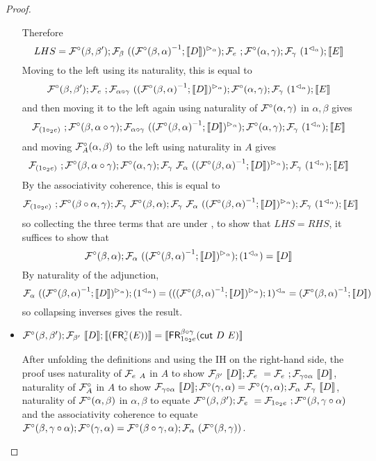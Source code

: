 \documentclass{drl-common/llncs}
\renewcommand{\sem}[1]{\ensuremath{ \llbracket #1 \rrbracket}}
\newcommand{\inv}[1]{\ensuremath{{#1}^{-1}}}
\newcommand\compo[2]{\ensuremath{#1 \circ #2}}
\newcommand\comph[2]{\ensuremath{#1 \mathbin{\circ_2} #2}}
\newcommand\cutsym{\ensuremath{\dsd{cut}}}
\newcommand\cut[2]{\ensuremath{{\cutsym \,\, #1 \,\, #2}}}
\newcommand\FR[3]{\ensuremath{\dsd{FR}^{#1}_{#2}(#3)}}
\begin{document}
\begin{proof}
\begin{itemize}
Therefore 
\[
LHS = \semFcomp(\beta,\beta');\semF{\beta}{(\semltor{(\inv{\semFcomp(\beta,\alpha)};\sem{D})}{\alpha}  )};
\semF{e};\semFcomp(\alpha,\gamma);\semF{\gamma}{(\semrtol{1}{\alpha})};\sem{E}
\]
Moving  to the left using its naturality, this is equal to
\[
\semFcomp(\beta,\beta');\semF{e};\semF{\compo{\alpha}{\gamma}}{(\semltor{(\inv{\semFcomp(\beta,\alpha)};\sem{D})}{\alpha}  )} ;\semFcomp(\alpha,\gamma);\semF{\gamma}{(\semrtol{1}{\alpha})};\sem{E}
\]
and then moving it to the left again using naturality of
$\mathcal{F}^\circ(\alpha,\gamma)$ in $\alpha,\beta$ gives
\[
\semF{(\comph{1}{e})};\semFcomp(\beta,\compo{\alpha}{\gamma});\semF{\compo{\alpha}{\gamma}}{(\semltor{(\inv{\semFcomp(\beta,\alpha)};\sem{D})}{\alpha}  )};\semFcomp(\alpha,\gamma);\semF{\gamma}{(\semrtol{1}{\alpha})};\sem{E}
\]
and moving $\mathcal{F}^\circ_A(\alpha,\beta)$ to the left using naturality in $A$ gives
\[
\semF{(\comph{1}{e})};\semFcomp(\beta,\compo{\alpha}{\gamma});\semFcomp(\alpha,\gamma);\semF{\gamma}{\semF{\alpha}{(\semltor{(\inv{\semFcomp(\beta,\alpha)};\sem{D})}{\alpha}  )}};\semF{\gamma}{(\semrtol{1}{\alpha})};\sem{E}
\]
By the associativity coherence, this is equal to
\[
\semF{(\comph{1}{e})};\semFcomp(\compo{\beta}{\alpha},{\gamma});\semF{\gamma}{\semFcomp(\beta,\alpha)};\semF{\gamma}{\semF{\alpha}{(\semltor{(\inv{\semFcomp(\beta,\alpha)};\sem{D})}{\alpha}  )}};\semF{\gamma}{(\semrtol{1}{\alpha})};\sem{E}
\]
so collecting the three terms that are under \semF{\gamma}, to show that $LHS
= RHS$, it suffices to show that
\[
{\semFcomp(\beta,\alpha)};{\semF{\alpha}{(\semltor{(\inv{\semFcomp(\beta,\alpha)};\sem{D})}{\alpha})}};{(\semrtol{1}{\alpha})} = \sem D
\]
By naturality of the adjunction,
\[
\semF{\alpha}{(\semltor{(\inv{\semFcomp(\beta,\alpha)};\sem{D})}{\alpha})};(\semrtol{1}{\alpha})
= 
\semrtol{({(\semltor{(\inv{\semFcomp(\beta,\alpha)};\sem{D})}{\alpha})};1)}{\alpha}
=
{(\inv{\semFcomp(\beta,\alpha)};\sem{D})}
\]
so collapsing inverses gives the result.  

\item $\semofcut D {(\FR \gamma e E)} = \sem{\FR {\compo{\beta}{\gamma}} {\comph{1}{e}} {\cut D E}}$

After unfolding the definitions and using the
IH on the right-hand side, 
the proof uses naturality of $\mathcal{F}_{e} \,\, _A$ in $A$ to show
$\semF{\beta'}{\sem D}; \semF{e} =
\semF{e};\semF{\compo{\gamma}{\alpha}}{\sem D}$, 
naturality of $\mathcal{F}^\circ_A$ in $A$ to show
$\semF{\compo{\gamma}{\alpha}}{\sem D};\semFcomp(\gamma,\alpha) = 
\semFcomp(\gamma,\alpha);\semF{\alpha}{\semF{\gamma}{\sem D}}$,
naturality of $\mathcal{F}^\circ(\alpha,\beta)$ in $\alpha,\beta$ to equate
$\semFcomp(\beta,\beta');\semF{e} =
\semF{\comph{1}{e}};\semFcomp(\beta,\compo{\gamma}{\alpha})$
and the associativity coherence to equate 
$\semFcomp(\beta,\compo{\gamma}{\alpha});\semFcomp(\gamma,\alpha)
= \semFcomp(\compo{\beta}{\gamma},\alpha);\semF{\alpha}(\semFcomp(\beta,\gamma))$.


\end{itemize}
\end{proof}
\end{document}
